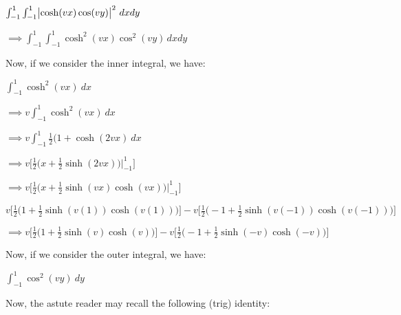 \documentclass[executivepaper]{article}
\begin{document}
\begin{flushleft}
\begin{center}
$\int_{-1}^{1} \int_{-1}^{1} \abs{\cosh(vx)\cos(vy)}^2 \,dx dy$

\vspace{1mm}

$\implies \int_{-1}^{1} \int_{-1}^{1} \cosh^2(vx)\cos^2(vy) \,dx dy$

\end{center}

Now, if we consider the inner integral, we have:

\begin{center}

$\int_{-1}^{1} \cosh^2(vx) \ dx$

\vspace{1mm}

$\implies v \int_{-1}^{1} \cosh^2(vx) \ dx$

\vspace{1mm}

$\implies v \int_{-1}^{1} \frac{1}{2} (1+\cosh(2vx) \ dx$

\vspace{1mm}

$\implies v \bigg[\frac{1}{2} \bigg(x+\frac{1}{2}\sinh(2vx)\bigg) \Big|_{-1}^{1}\bigg]$

\pagebreak

\vspace*{-40mm}

$\implies v \bigg[\frac{1}{2} \bigg(x+\frac{1}{2}\sinh(vx)\cosh(vx)\bigg) \Big|_{-1}^{1}\bigg]$

\vspace{3mm}

$v \bigg[\frac{1}{2} \bigg(1+\frac{1}{2}\sinh(v(1))\cosh(v(1))\bigg) \bigg]-v \bigg[\frac{1}{2} \bigg(-1+\frac{1}{2}\sinh(v(-1))\cosh(v(-1))\bigg) \bigg]$

\vspace{3mm}

$\implies v \bigg[\frac{1}{2} \bigg(1+\frac{1}{2}\sinh(v)\cosh(v)\bigg) \bigg]-v \bigg[\frac{1}{2} \bigg(-1+\frac{1}{2}\sinh(-v)\cosh(-v)\bigg) \bigg]$

\end{center}

Now, if we consider the outer integral, we have:

\begin{center}

$\int_{-1}^{1} \cos^2(vy) \ dy$

\end{center}

Now, the astute reader may recall the following (trig) identity:


\end{flushleft}
\end{document}
